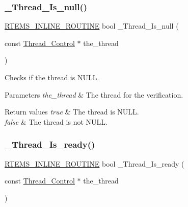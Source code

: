 \subsubsection{\texorpdfstring{\_Thread\_Is\_null()}{\_Thread\_Is\_null()}}
{\footnotesize\ttfamily \mbox{\hyperlink{group__RTEMSScoreBaseDefs_gac216239df231d5dbd15e3520b0b9313f}{R\+T\+E\+M\+S\+\_\+\+I\+N\+L\+I\+N\+E\+\_\+\+R\+O\+U\+T\+I\+NE}} bool \+\_\+\+Thread\+\_\+\+Is\+\_\+null (\begin{DoxyParamCaption}\item[{const \mbox{\hyperlink{struct__Thread__Control}{Thread\+\_\+\+Control}} $\ast$}]{the\+\_\+thread }\end{DoxyParamCaption})}



Checks if the thread is N\+U\+LL. 


\begin{DoxyParams}{Parameters}
{\em the\+\_\+thread} & The thread for the verification.\\
\hline
\end{DoxyParams}

\begin{DoxyRetVals}{Return values}
{\em true} & The thread is {\ttfamily N\+U\+LL}. \\
\hline
{\em false} & The thread is not {\ttfamily N\+U\+LL}. \\
\hline
\end{DoxyRetVals}
\mbox{\label{group__RTEMSScoreThread_gab4493fc6ffddc8fd05987cb405f9cf71}} 
\subsubsection{\texorpdfstring{\_Thread\_Is\_ready()}{\_Thread\_Is\_ready()}}
{\footnotesize\ttfamily \mbox{\hyperlink{group__RTEMSScoreBaseDefs_gac216239df231d5dbd15e3520b0b9313f}{R\+T\+E\+M\+S\+\_\+\+I\+N\+L\+I\+N\+E\+\_\+\+R\+O\+U\+T\+I\+NE}} bool \+\_\+\+Thread\+\_\+\+Is\+\_\+ready (\begin{DoxyParamCaption}\item[{const \mbox{\hyperlink{struct__Thread__Control}{Thread\+\_\+\+Control}} $\ast$}]{the\+\_\+thread }\end{DoxyParamCaption})}



